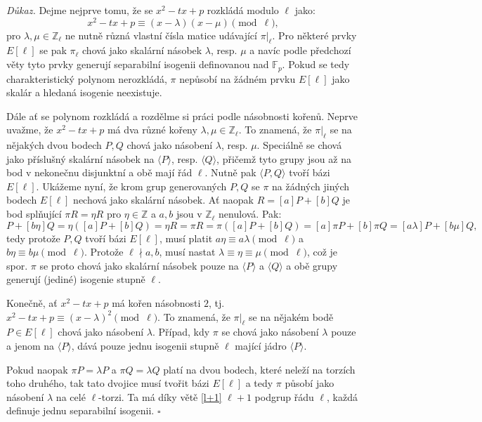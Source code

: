 \documentclass[12pt]{report}
\begin{document}
\noindent \textit{Důkaz.} Dejme nejprve tomu, že se $x^2 - tx+p$ rozkládá modulo $\ell$ jako:
\begin{equation*}
x^2 - tx + p \equiv (x-\lambda) (x- \mu) \pmod{\ell},
\end{equation*} 
pro $\lambda,\mu \in \mathbb{Z}_{\ell}$ ne nutně různá vlastní čísla matice udávající $\pi \vert_{\ell}$. Pro některé prvky $E[\ell]$ se pak $\pi_{\ell}$ chová jako skalární násobek $\lambda$, resp. $\mu$ a navíc podle předchozí věty tyto prvky generují separabilní isogenii definovanou nad $\mathbb{F}_p$. Pokud se tedy charakteristický polynom nerozkládá, $\pi$ nepůsobí na žádném prvku $E[\ell]$ jako skalár a hledaná isogenie neexistuje.

Dále ať se polynom rozkládá a rozdělme si práci podle násobnosti kořenů. Neprve uvažme, že $x^2 - tx + p$ má dva různé kořeny $\lambda, \mu \in \mathbb{Z}_{\ell}$. To znamená, že $\pi \vert_{\ell}$ se na nějakých dvou bodech $P,Q$ chová jako násobení $\lambda$, resp. $\mu$. Speciálně se chová jako příslušný skalární násobek na $\langle P \rangle$, resp. $\langle Q \rangle$, přičemž tyto grupy jsou až na bod v nekonečnu disjunktní a obě mají řád $\ell$. Nutně pak $\langle P,Q \rangle$ tvoří bázi $E[\ell]$. Ukážeme nyní, že krom grup generovaných $P,Q$ se $\pi$ na žádných jiných bodech $E[\ell]$ nechová jako skalární násobek. Ať naopak $R = [a]P + [b]Q$ je bod splňující $\pi R = \eta R$ pro $\eta \in \mathbb{Z}$ a $a,b$ jsou v $\mathbb{Z}_{\ell}$ nenulová. Pak:
\begin{equation*} 
[a \eta] P + [b \eta] Q = \eta ([a]P + [b]Q) = \eta R = \pi R = \pi ([a]P + [b]Q) = [a]\pi P + [b] \pi Q = [a \lambda] P + [b \mu] Q,
\end{equation*}
tedy protože $P,Q$ tvoří bázi $E[\ell]$, musí platit $a \eta \equiv a \lambda \pmod{\ell}$ a $b \eta \equiv b \mu \pmod{\ell}$. Protože $\ell \nmid a,b$, musí nastat $\lambda \equiv \eta \equiv \mu \pmod{\ell}$, což je spor. $\pi$ se proto chová jako skalární násobek pouze na $\langle P \rangle$ a $\langle Q \rangle$ a obě grupy generují (jediné) isogenie stupně $\ell$.

Konečně, ať $x^2 - tx + p$ má kořen  násobnosti $2$, tj. $x^2 - tx + p \equiv (x-\lambda)^2 \pmod{\ell}$.  To znamená, že $\pi \vert_{\ell}$ se na nějakém bodě $P \in E[\ell]$ chová jako násobení $\lambda$. Případ, kdy $\pi$ se chová jako násobení $\lambda$ pouze a jenom na $\langle P \rangle$, dává pouze jednu isogenii stupně $\ell$ mající jádro $\langle P \rangle$.

Pokud naopak $\pi P = \lambda P$ a $\pi Q = \lambda Q$ platí na dvou bodech, které neleží na torzích toho druhého, tak tato dvojice musí tvořit bázi $E[\ell]$ a tedy $\pi$ působí jako násobení $\lambda$ na celé $\ell$-torzi. Ta má díky větě \ref{l+1} $\ell+1$ podgrup řádu $\ell$, každá definuje jednu separabilní isogenii. \hfill $\square$\\
\end{document}
